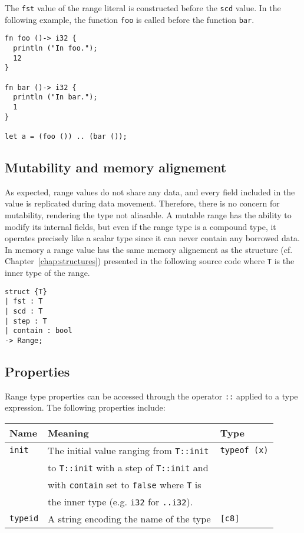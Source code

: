 The \texttt{fst} value of the range literal is constructed before the
\texttt{scd} value. In the following example, the function \texttt{foo} is
called before the function \texttt{bar}.

\begin{lstlisting}[style=coloredverbatim]
fn foo ()-> i32 {
  println ("In foo.");
  12
}

fn bar ()-> i32 {
  println ("In bar.");
  1
}

let a = (foo ()) .. (bar ());
\end{lstlisting}

\subsection {Mutability and memory alignement}

As expected, range values do not share any data, and every field included in the
value is replicated during data movement. Therefore, there is no concern for
mutability, rendering the type not aliasable. A mutable range has the ability to
modify its internal fields, but even if the range type is a compound type, it
operates precisely like a scalar type since it can never contain any borrowed
data. In memory a range value has the same memory alignement as the structure
(cf. Chapter~\ref{chap:structures}) presented in the following source code where
\texttt{T} is the inner type of the range.

\begin{lstlisting}[style=coloredverbatim]
struct {T}
| fst : T
| scd : T
| step : T
| contain : bool
-> Range;
\end{lstlisting}

\subsection {Properties}

Range type properties can be accessed through the operator \texttt{::} applied
to a type expression. The following properties include:

\begin{center}\begin{adjustbox}{max width=\linewidth}
  \begin{tabular}{|l|ll|}
    \hline
    Name & Meaning & Type\\
    \hline
    \hline
    \texttt{init} & The initial value ranging from \texttt{T::init} & \texttt{typeof (x)}\\
    & to \texttt{T::init} with a step of \texttt{T::init} and & \\
    & with \texttt{contain} set to \texttt{false} where \texttt{T} is & \\
    & the inner type (e.g. \texttt{i32} for \texttt{..i32}). &\\
    \hline
    \texttt{typeid} & A string encoding the name of the type & \texttt{[c8]} \\
    \hline
  \end{tabular}
\end{adjustbox}\end{center}


